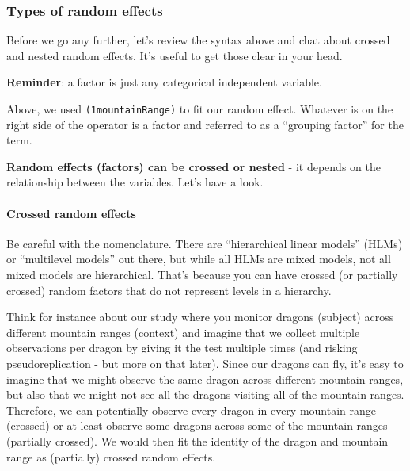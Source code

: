 \documentclass[
]{article}
\begin{document}
\subsubsection{Types of random effects}\label{types-of-random-effects}

Before we go any further, let's review the syntax above and chat about
crossed and nested random effects. It's useful to get those clear in
your head.

\textbf{Reminder}: a factor is just any categorical independent
variable.

Above, we used \texttt{(1\textbar{}mountainRange)} to fit our random
effect. Whatever is on the right side of the \textbar{} operator is a
factor and referred to as a ``grouping factor'' for the term.

\textbf{Random effects (factors) can be crossed or nested} - it depends
on the relationship between the variables. Let's have a look.

\paragraph{Crossed random effects}\label{crossed-random-effects}

Be careful with the nomenclature. There are ``hierarchical linear
models'' (HLMs) or ``multilevel models'' out there, but while all HLMs
are mixed models, not all mixed models are hierarchical. That's because
you can have crossed (or partially crossed) random factors that do not
represent levels in a hierarchy.

Think for instance about our study where you monitor dragons (subject)
across different mountain ranges (context) and imagine that we collect
multiple observations per dragon by giving it the test multiple times
(and risking pseudoreplication - but more on that later). Since our
dragons can fly, it's easy to imagine that we might observe the same
dragon across different mountain ranges, but also that we might not see
all the dragons visiting all of the mountain ranges. Therefore, we can
potentially observe every dragon in every mountain range (crossed) or at
least observe some dragons across some of the mountain ranges (partially
crossed). We would then fit the identity of the dragon and mountain
range as (partially) crossed random effects.
\end{document}
